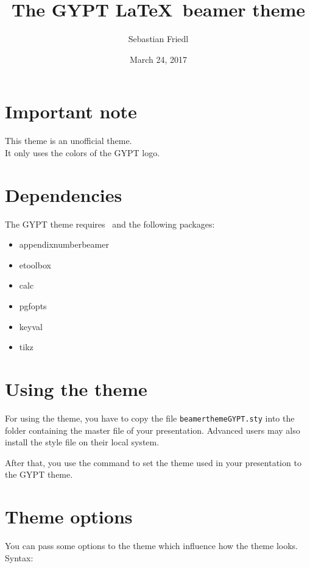 \documentclass[12pt,a4paper]{scrartcl}
\title{The GYPT \LaTeX\ beamer theme}
\author{Sebastian Friedl}
\date{March 24, 2017}
\begin{document}
	\maketitle
	\thispagestyle{empty}
	
	
	\section*{Important note}
	This theme is an unofficial theme. \\
	It only uses the colors of the GYPT logo.
	
		
	\section*{Dependencies}
	The GYPT theme requires \LaTeXe\ and the following packages:
	\begin{itemize} \ttfamily
		\item appendixnumberbeamer
		\item etoolbox
		\item calc
		\item pgfopts
		\item keyval
		\item tikz
	\end{itemize}
	
	
	\section{Using the theme}
	For using the theme, you have to copy the file \texttt{beamerthemeGYPT.sty} into the folder containing the master file of your presentation. Advanced users may also install the style file on their local system. \par
	After that, you use the command \texttt{} to set the theme used in your presentation to the GYPT theme.

	
	\section{Theme options}
	You can pass some options to the theme which influence how the theme looks. \\
	Syntax: \ \ \texttt{} \\\vspace{0.5ex}
	
\end{document}
